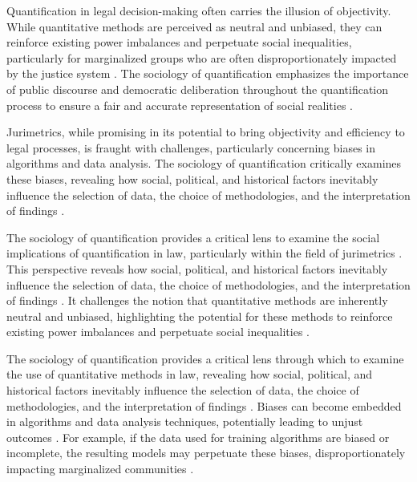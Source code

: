 Quantification in legal decision-making often carries the illusion of objectivity. While quantitative methods are perceived as neutral and unbiased, they can reinforce existing power imbalances and perpetuate social inequalities, particularly for marginalized groups who are often disproportionately impacted by the justice system \cite{10.1590/dados.2022.65.3.267,10.3390/fi9040068}. The sociology of quantification emphasizes the importance of public discourse and democratic deliberation throughout the quantification process to ensure a fair and accurate representation of social realities \cite{10.1590/dados.2022.65.3.267,10.3390/fi9040068}.

Jurimetrics, while promising in its potential to bring objectivity and efficiency to legal processes, is fraught with challenges, particularly concerning biases in algorithms and data analysis. The sociology of quantification critically examines these biases, revealing how social, political, and historical factors inevitably influence the selection of data, the choice of methodologies, and the interpretation of findings \cite{10.1590/dados.2022.65.3.267,10.3390/fi9040068}.

The sociology of quantification provides a critical lens to examine the social implications of quantification in law, particularly within the field of jurimetrics \cite{10.1057/s41599-020-00557-0,de2010jurimetrics}. This perspective reveals how social, political, and historical factors inevitably influence the selection of data, the choice of methodologies, and the interpretation of findings \cite{10.1057/s41599-020-00557-0,de2010jurimetrics}. It challenges the notion that quantitative methods are inherently neutral and unbiased, highlighting the potential for these methods to reinforce existing power imbalances and perpetuate social inequalities \cite{10.1057/s41599-020-00557-0,de2010jurimetrics}.

The sociology of quantification provides a critical lens through which to examine the use of quantitative methods in law, revealing how social, political, and historical factors inevitably influence the selection of data, the choice of methodologies, and the interpretation of findings \cite{10.5040/9781350220645,10.1080/07329113.2015.1046739}. Biases can become embedded in algorithms and data analysis techniques, potentially leading to unjust outcomes \cite{10.5040/9781350220645,10.1080/07329113.2015.1046739}. For example, if the data used for training algorithms are biased or incomplete, the resulting models may perpetuate these biases, disproportionately impacting marginalized communities \cite{10.5040/9781350220645,10.1080/07329113.2015.1046739}.

